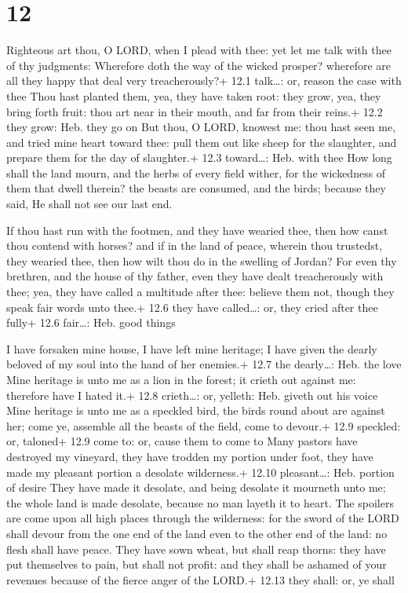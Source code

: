 \hypertarget{section-11}{%
\section{12}\label{section-11}}

 Righteous art thou, O LORD, when I plead with thee: yet let
me talk with thee of thy judgments: Wherefore doth the way of the wicked
prosper? wherefore are all they happy that deal very treacherously?+
12.1 talk\ldots: or, reason the case with thee  Thou hast
planted them, yea, they have taken root: they grow, yea, they bring
forth fruit: thou art near in their mouth, and far from their reins.+
12.2 they grow: Heb. they go on  But thou, O LORD, knowest
me: thou hast seen me, and tried mine heart toward thee: pull them out
like sheep for the slaughter, and prepare them for the day of
slaughter.+ 12.3 toward\ldots: Heb. with thee  How long
shall the land mourn, and the herbs of every field wither, for the
wickedness of them that dwell therein? the beasts are consumed, and the
birds; because they said, He shall not see our last end.

 If thou hast run with the footmen, and they have wearied
thee, then how canst thou contend with horses? and if in the land of
peace, wherein thou trustedst, they wearied thee, then how wilt thou do
in the swelling of Jordan?  For even thy brethren, and the
house of thy father, even they have dealt treacherously with thee; yea,
they have called a multitude after thee: believe them not, though they
speak fair words unto thee.+ 12.6 they have called\ldots: or, they cried
after thee fully+ 12.6 fair\ldots: Heb. good things

 I have forsaken mine house, I have left mine heritage; I
have given the dearly beloved of my soul into the hand of her enemies.+
12.7 the dearly\ldots: Heb. the love  Mine heritage is unto
me as a lion in the forest; it crieth out against me: therefore have I
hated it.+ 12.8 crieth\ldots: or, yelleth: Heb. giveth out his voice
 Mine heritage is unto me as a speckled bird, the birds
round about are against her; come ye, assemble all the beasts of the
field, come to devour.+ 12.9 speckled: or, taloned+ 12.9 come to: or,
cause them to come to  Many pastors have destroyed my
vineyard, they have trodden my portion under foot, they have made my
pleasant portion a desolate wilderness.+ 12.10 pleasant\ldots: Heb.
portion of desire  They have made it desolate, and being
desolate it mourneth unto me; the whole land is made desolate, because
no man layeth it to heart.  The spoilers are come upon all
high places through the wilderness: for the sword of the LORD shall
devour from the one end of the land even to the other end of the land:
no flesh shall have peace.  They have sown wheat, but shall
reap thorns: they have put themselves to pain, but shall not profit: and
they shall be ashamed of your revenues because of the fierce anger of
the LORD.+ 12.13 they shall: or, ye shall

